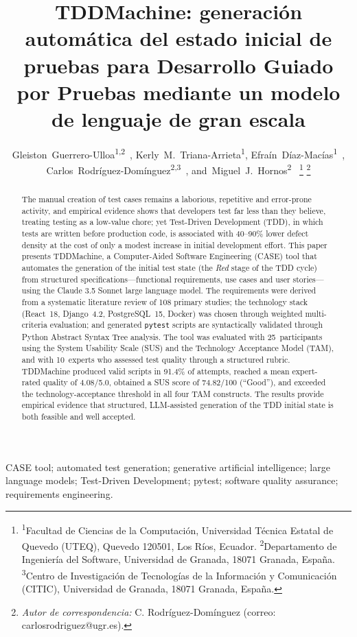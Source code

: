 \documentclass[10pt,journal,twoside,letterpaper]{IEEEtran}
\author{%
	Gleiston~Guerrero-Ulloa\textsuperscript{1,2}~\orcidlink{0000-0001-5990-2357},
	Kerly~M.~Triana-Arrieta\textsuperscript{1},
	Efraín~Díaz-Macías\textsuperscript{1}~\orcidlink{0000-0003-4087-029X},
	Carlos~Rodríguez-Domínguez\textsuperscript{2,3}~\orcidlink{0000-0001-5626-3115},
	and~Miguel~J.~Hornos\textsuperscript{2}~\orcidlink{0000-0001-5722-9816}%
	\thanks{\textsuperscript{1}Facultad de Ciencias de la Computación, Universidad Técnica Estatal de Quevedo (UTEQ), Quevedo 120501, Los Ríos, Ecuador. \textsuperscript{2}Departamento de Ingeniería del Software, Universidad de Granada, 18071 Granada, España. \textsuperscript{3}Centro de Investigación de Tecnologías de la Información y Comunicación (CITIC), Universidad de Granada, 18071 Granada, España.}%
	\thanks{\emph{Autor de correspondencia:} C. Rodríguez-Domínguez (correo: carlosrodriguez@ugr.es).}%
}
\begin{document}
	
	\IEEEoverridecommandlockouts
	
	\title{TDDMachine: generación automática del estado inicial de pruebas para Desarrollo Guiado por Pruebas mediante un modelo de lenguaje de gran escala}
	
	\maketitle
	\thispagestyle{enfoqueutefirstpage}
	
	\begin{abstract}
		The manual creation of test cases remains a laborious, repetitive and error-prone activity, and empirical evidence shows that developers test far less than they believe, treating testing as a low-value chore; yet Test-Driven Development (TDD), in which tests are written before production code, is associated with 40--90\% lower defect density at the cost of only a modest increase in initial development effort. This paper presents TDDMachine, a Computer-Aided Software Engineering (CASE) tool that automates the generation of the initial test state (the \emph{Red} stage of the TDD cycle) from structured specifications---functional requirements, use cases and user stories---using the Claude 3.5 Sonnet large language model. The requirements were derived from a systematic literature review of 108 primary studies; the technology stack (React~18, Django~4.2, PostgreSQL~15, Docker) was chosen through weighted multi-criteria evaluation; and generated \texttt{pytest} scripts are syntactically validated through Python Abstract Syntax Tree analysis. The tool was evaluated with 25~participants using the System Usability Scale (SUS) and the Technology Acceptance Model (TAM), and with 10~experts who assessed test quality through a structured rubric. TDDMachine produced valid scripts in 91.4\% of attempts, reached a mean expert-rated quality of 4.08/5.0, obtained a SUS score of 74.82/100 (``Good''), and exceeded the technology-acceptance threshold in all four TAM constructs. The results provide empirical evidence that structured, LLM-assisted generation of the TDD initial state is both feasible and well accepted.
	\end{abstract}
	
	\begin{IEEEkeywords}
		CASE tool; automated test generation; generative artificial intelligence; large language models; Test-Driven Development; pytest; software quality assurance; requirements engineering.
	\end{IEEEkeywords}
	
\end{document}
